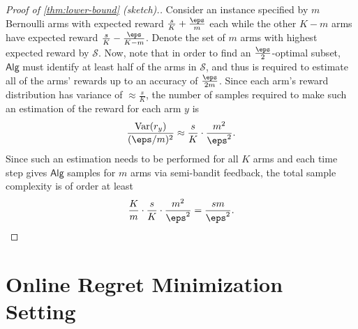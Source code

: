 \documentclass[11pt]{article}
\newcommand{\lab}{y}
\theoremstyle{plain}
\begin{document}
\begin{proof}[Proof of \cref{thm:lower-bound} (sketch).] Consider an instance specified by $m$ Bernoulli arms with expected reward $\frac{s}{K} + \frac{\eps}{m}$ each while the other $K-m$ arms have expected reward $\frac{s}{K} - \frac{\eps}{K-m}$. Denote the set of $m$ arms with highest expected reward by $\mathcal{S}$. Now, note that in order to find an $\frac{\eps}{2}$-optimal subset, $\mathsf{Alg}$ must identify at least half of the arms in $\mathcal{S}$, and thus is required to estimate all of the arms' rewards up to an accuracy of $\frac{\eps}{2m}$. Since each arm's reward distribution has variance of $\approx \frac{s}{K}$, the number of samples required to make such an estimation of the reward for each arm $\lab$ is
    \begin{align*}
        \frac{\operatorname{Var}(r_\lab)}{(\eps / m)^2} \approx \frac{s}{K} \cdot \frac{m^2}{\eps^2}.
    \end{align*}
    Since such an estimation needs to be performed for all $K$ arms and each time step gives $\mathsf{Alg}$ samples for $m$ arms via semi-bandit feedback, the total sample complexity is of order at least
    \begin{align*}
        \frac{K}{m} \cdot \frac{s}{K} \cdot \frac{m^2}{\eps^2} = \frac{s m}{\eps^2}.
    \end{align*}
\end{proof}


\section{Online Regret Minimization Setting}
\label{sec:regret}
\end{document}
